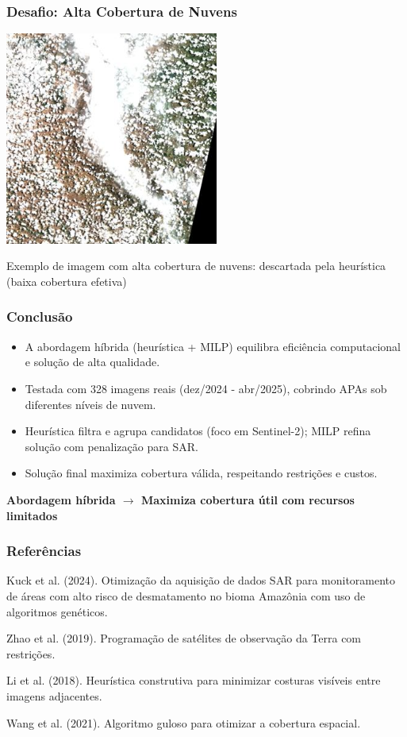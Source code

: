 \documentclass{beamer}
\begin{document}
\begin{frame}
    \frametitle{Desafio: Alta Cobertura de Nuvens}
    \begin{center}
        \includegraphics[width=0.85\linewidth,height=7cm,keepaspectratio]{images/muitanuvem.jpg}
    \end{center}
    
    \centering
    \small Exemplo de imagem com alta cobertura de nuvens: descartada pela heurística (baixa cobertura efetiva)
\end{frame}

\begin{frame}
    \frametitle{Conclusão}
    \begin{itemize}
        \item A abordagem híbrida (heurística + MILP) equilibra eficiência computacional e solução de alta qualidade.
        \item Testada com 328 imagens reais (dez/2024 - abr/2025), cobrindo APAs sob diferentes níveis de nuvem.
        \item Heurística filtra e agrupa candidatos (foco em Sentinel-2); MILP refina solução com penalização para SAR.
        \item Solução final maximiza cobertura válida, respeitando restrições e custos.
    \end{itemize}
    
    \vspace{0.3cm}
    \centering
    \textbf{Abordagem híbrida $\rightarrow$ Maximiza cobertura útil com recursos limitados}
\end{frame}

\begin{frame}
    \frametitle{Referências}
    \begin{thebibliography}{9}
         Kuck et al. (2024). Otimização da aquisição de dados SAR para monitoramento de áreas com alto risco de desmatamento no bioma Amazônia com uso de algoritmos genéticos.
        
         Zhao et al. (2019). Programação de satélites de observação da Terra com restrições.
        
         Li et al. (2018). Heurística construtiva para minimizar costuras visíveis entre imagens adjacentes.
        
         Wang et al. (2021). Algoritmo guloso para otimizar a cobertura espacial.
    \end{thebibliography}
\end{frame}
\end{document}
